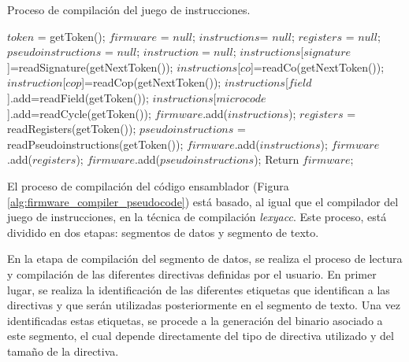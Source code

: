 \clearpage

\begin{algorithm}[h]
	\caption{Proceso de compilación del juego de instrucciones.}
	\label{alg:firmware_compiler_pseudocode}
  	\scriptsize
	\begin{algorithmic}[1]
		\State $token$ = getToken();
		\State $firmware$ = $null$;
		\State $instructions $= $null$;
		\State $registers$ = $null$;
		\State $pseudoinstructions$ = $null$;
			\State $instruction = null$;
			\State $instructions$[$signature$]=readSignature(getNextToken());
			\State $instructions$[$co$]=readCo(getNextToken());
				\State $instruction$[$cop$]=readCop(getNextToken());
			\EndIf
				\State $instructions$[$field$].add=readField(getToken());
			\EndWhile
				\State $instructions$[$microcode$].add=readCycle(getToken());
			\EndWhile
			\State $firmware$.add($instructions$);
		\EndWhile
			\State $registers$ = readRegisters(getToken());
		\EndIf
			\State $pseudoinstructions$ = readPseudoinstructions(getToken());
		\EndIf
		\State $firmware$.add($instructions$);
		\State $firmware$.add($registers$);
		\State $firmware$.add($pseudoinstructions$);
		\State Return $firmware$;
		\EndFunction
	\end{algorithmic}
\end{algorithm}

\clearpage

El proceso de compilación del código \gls{ensamblador} (Figura \ref{alg:firmware_compiler_pseudocode}) está basado, al igual que el compilador del juego de instrucciones, en la técnica de compilación \textit{\gls{lexyacc}}. Este proceso, está dividido en dos etapas: segmentos de datos y segmento de texto.

En la etapa de compilación del segmento de datos, se realiza el proceso de lectura y compilación de las diferentes directivas definidas por el usuario. En primer lugar, se realiza la identificación de las diferentes etiquetas que identifican a las directivas y que serán utilizadas posteriormente en el segmento de texto. Una vez identificadas estas etiquetas, se procede a la generación del binario asociado a este segmento, el cual depende directamente del tipo de directiva utilizado y del tamaño de la directiva.

